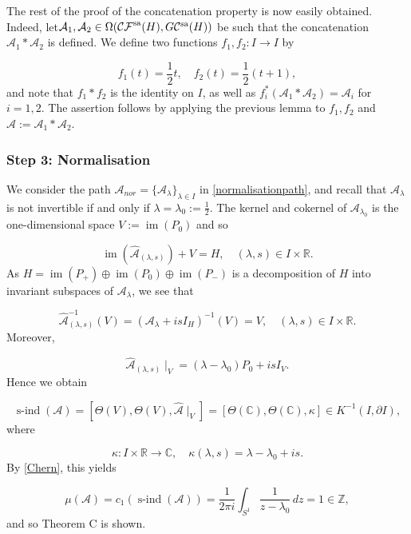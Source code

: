 \documentclass[a4paper,10pt]{article}
\DeclareMathOperator{\im}{im}
\DeclareMathOperator{\sind}{s-ind}
\begin{document}
\noindent 
The rest of the proof of the concatenation property is now easily obtained. Indeed, let\linebreak $\mathcal{A}_1,\mathcal{A}_2\in\Omega(\mathcal{CF}^\textup{sa}(H),G\mathcal{C}^\textup{sa}(H))$ be such that the concatenation $\mathcal{A}_1\ast\mathcal{A}_2$ is defined. We define two functions $f_1,f_2:I\rightarrow I$ by 

\[f_1(t)=\frac{1}{2}t,\quad f_2(t)=\frac{1}{2}(t+1),\]
and note that $f_1\ast f_2$ is the identity on $I$, as well as $f^\ast_i(\mathcal{A}_1\ast\mathcal{A}_2)=\mathcal{A}_i$ for $i=1,2$. The assertion follows by applying the previous lemma to $f_1, f_2$ and $\mathcal{A}:=\mathcal{A}_1\ast\mathcal{A}_2$.


\subsubsection*{Step 3: Normalisation} 
We consider the path $\mathcal{A}_{nor}=\{\mathcal{A}_\lambda\}_{\lambda\in I}$ in \eqref{normalisationpath}, and recall that $\mathcal{A}_\lambda$ is not invertible if and only if $\lambda=\lambda_0:=\frac{1}{2}$. The kernel and cokernel of $\mathcal{A}_{\lambda_0}$ is the one-dimensional space $V:=\im(P_0)$ and so 

\[\im(\hat{\mathcal{A}}_{(\lambda,s)})+V=H,\quad  (\lambda,s)\in I\times\mathbb{R}.\]
As $H=\im(P_+)\oplus\im(P_0)\oplus\im(P_-)$ is a decomposition of $H$ into invariant subspaces of $\mathcal{A}_\lambda$, we see that 

\[\hat{\mathcal{A}}^{-1}_{(\lambda,s)}(V)=(\mathcal{A}_\lambda+is I_H)^{-1}(V)=V, \quad (\lambda,s)\in I\times\mathbb{R}.\] 
Moreover, 

\[\hat{\mathcal{A}}_{(\lambda,s)}\mid_V=\left(\lambda-\lambda_0\right)P_0+is I_V.\]
Hence we obtain 

\[\sind(\mathcal{A})=[\Theta(V),\Theta(V),\hat{\mathcal{A}}\mid_V]=[\Theta(\mathbb{C}),\Theta(\mathbb{C}),\kappa]\in K^{-1}(I,\partial I),\]
where 

\[\kappa:I\times\mathbb{R}\rightarrow\mathbb{C},\quad \kappa(\lambda,s)=\lambda-\lambda_0+is.\]
By \eqref{Chern}, this yields

\[\mu(\mathcal{A})=c_1(\sind(\mathcal{A}))=\frac{1}{2\pi i}\int_{S^1}{\frac{1}{z-\lambda_0}\,dz}=1\in\mathbb{Z},\]
and so Theorem C is shown. 
\end{document}
